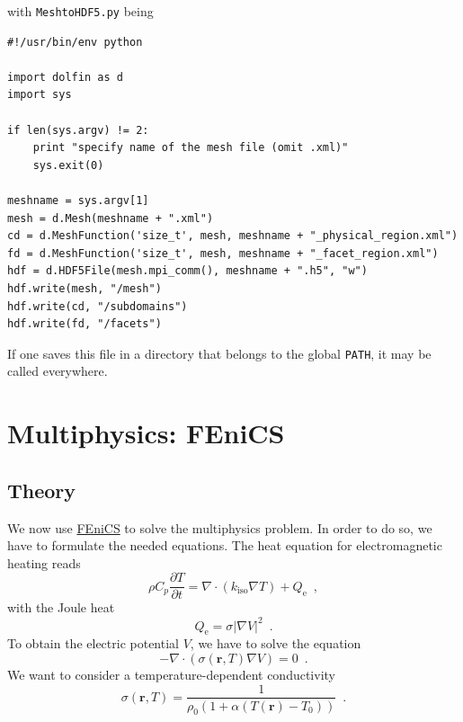 \documentclass{article}
\begin{document}
with \texttt{MeshtoHDF5.py} being
\begin{lstlisting}
#!/usr/bin/env python

import dolfin as d
import sys

if len(sys.argv) != 2:
    print "specify name of the mesh file (omit .xml)"
    sys.exit(0)

meshname = sys.argv[1]
mesh = d.Mesh(meshname + ".xml")
cd = d.MeshFunction('size_t', mesh, meshname + "_physical_region.xml")
fd = d.MeshFunction('size_t', mesh, meshname + "_facet_region.xml")
hdf = d.HDF5File(mesh.mpi_comm(), meshname + ".h5", "w")
hdf.write(mesh, "/mesh")
hdf.write(cd, "/subdomains")
hdf.write(fd, "/facets")
\end{lstlisting}
If one saves this file in a directory that belongs to the global \texttt{PATH}, it may be called everywhere.
\section{Multiphysics: FEniCS}
\subsection{Theory}
We now use \href{https://fenicsproject.org/}{FEniCS} to solve the multiphysics problem.
In order to do so, we have to formulate the needed equations.
The heat equation for electromagnetic heating reads
\begin{equation}
\label{Eq:HeatEq}
\rho C_p \frac{\partial T}{\partial t} =  \nabla \cdot (k_{\mathrm{iso}} \nabla T) + Q_{\mathrm{e}} \enspace ,
\end{equation}
with the Joule heat
\begin{equation}
Q_\mathrm{e} = \sigma |\nabla V|^2 \enspace .
\end{equation}
To obtain the electric potential $V$, we have to solve the equation
\begin{equation}
\label{Eq:PotEq}
- \nabla \cdot \left(\sigma(\mathbf{r}, T) \nabla V\right) = 0 \enspace .
\end{equation}
We want to consider a temperature-dependent conductivity
\begin{equation}
\sigma (\mathbf{r},T) = \frac{1}{\rho_0 (1+ \alpha ( T(\mathbf{r})- T_0))} \enspace .
\end{equation}
\end{document}
